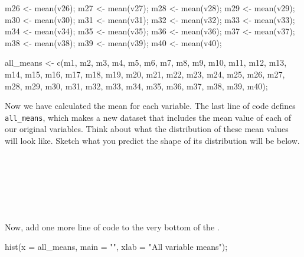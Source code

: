 \documentclass[
  openany]{krantz}
\makeatletter
\newenvironment{Shaded}{\begin{snugshade}}{\end{snugshade}}
\newcommand{\AttributeTok}[1]{\textcolor[rgb]{0.61,0.61,0.61}{#1}}
\newcommand{\FunctionTok}[1]{\textcolor[rgb]{0,0,0}{#1}}
\newcommand{\NormalTok}[1]{#1}
\newcommand{\OtherTok}[1]{\textcolor[rgb]{0.37,0.37,0.37}{#1}}
\newcommand{\StringTok}[1]{\textcolor[rgb]{0.5,0.5,0.5}{#1}}
\newenvironment{kframe}{%
\medskip{}
\setlength{\fboxsep}{.8em}
 \def\at@end@of@kframe{}%
 \ifinner\ifhmode%
  \def\at@end@of@kframe{\end{minipage}}%
  \begin{minipage}{\columnwidth}%
 \fi\fi%
 \def\FrameCommand##1{\hskip\@totalleftmargin \hskip-\fboxsep
 \colorbox{shadecolor}{##1}\hskip-\fboxsep
     \hskip-\linewidth \hskip-\@totalleftmargin \hskip\columnwidth}%
 \MakeFramed {\advance\hsize-\width
   \@totalleftmargin\z@ \linewidth\hsize
   \@setminipage}}%
 {\par\unskip\endMakeFramed%
 \at@end@of@kframe}
\renewenvironment{Shaded}{\begin{kframe}}{\end{kframe}}
\makeatother
\begin{document}
\begin{Shaded}
\begin{Highlighting}[]
\NormalTok{m26 }\OtherTok{\textless{}{-}} \FunctionTok{mean}\NormalTok{(v26);}
\NormalTok{m27 }\OtherTok{\textless{}{-}} \FunctionTok{mean}\NormalTok{(v27);}
\NormalTok{m28 }\OtherTok{\textless{}{-}} \FunctionTok{mean}\NormalTok{(v28);}
\NormalTok{m29 }\OtherTok{\textless{}{-}} \FunctionTok{mean}\NormalTok{(v29);}
\NormalTok{m30 }\OtherTok{\textless{}{-}} \FunctionTok{mean}\NormalTok{(v30);}
\NormalTok{m31 }\OtherTok{\textless{}{-}} \FunctionTok{mean}\NormalTok{(v31);}
\NormalTok{m32 }\OtherTok{\textless{}{-}} \FunctionTok{mean}\NormalTok{(v32);}
\NormalTok{m33 }\OtherTok{\textless{}{-}} \FunctionTok{mean}\NormalTok{(v33);}
\NormalTok{m34 }\OtherTok{\textless{}{-}} \FunctionTok{mean}\NormalTok{(v34);}
\NormalTok{m35 }\OtherTok{\textless{}{-}} \FunctionTok{mean}\NormalTok{(v35);}
\NormalTok{m36 }\OtherTok{\textless{}{-}} \FunctionTok{mean}\NormalTok{(v36);}
\NormalTok{m37 }\OtherTok{\textless{}{-}} \FunctionTok{mean}\NormalTok{(v37);}
\NormalTok{m38 }\OtherTok{\textless{}{-}} \FunctionTok{mean}\NormalTok{(v38);}
\NormalTok{m39 }\OtherTok{\textless{}{-}} \FunctionTok{mean}\NormalTok{(v39);}
\NormalTok{m40 }\OtherTok{\textless{}{-}} \FunctionTok{mean}\NormalTok{(v40);}

\NormalTok{all\_means }\OtherTok{\textless{}{-}} \FunctionTok{c}\NormalTok{(m1,  m2,  m3,  m4,  m5,  m6,  m7,  m8,  m9,  m10, }
\NormalTok{               m11, m12, m13, m14, m15, m16, m17, m18, m19, m20,}
\NormalTok{               m21, m22, m23, m24, m25, m26, m27, m28, m29, m30,}
\NormalTok{               m31, m32, m33, m34, m35, m36, m37, m38, m39, m40);}
\end{Highlighting}
\end{Shaded}

Now we have calculated the mean for each variable.
The last line of code defines \texttt{all\_means}, which makes a new dataset that includes the mean value of each of our original variables.
Think about what the distribution of these mean values will look like.
Sketch what you predict the shape of its distribution will be below.

\begin{verbatim}






\end{verbatim}

Now, add one more line of code to the very bottom of the .

\begin{Shaded}
\begin{Highlighting}[]
\FunctionTok{hist}\NormalTok{(}\AttributeTok{x =}\NormalTok{ all\_means, }\AttributeTok{main =} \StringTok{""}\NormalTok{, }\AttributeTok{xlab =} \StringTok{"All variable means"}\NormalTok{);}
\end{Highlighting}
\end{Shaded}
\end{document}
